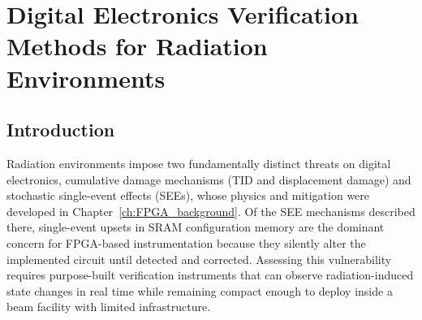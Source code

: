 %
%

\chapter{Digital Electronics Verification Methods for Radiation Environments}
\label{ch:digital_electronics}

\section{Introduction}
\label{sec:ch6_intro}

Radiation environments impose two fundamentally distinct threats on
digital electronics, cumulative damage mechanisms (TID and displacement
damage) and stochastic single-event effects (SEEs), whose physics and
mitigation were developed in Chapter~\ref{ch:FPGA_background}.  Of the
SEE mechanisms described there, single-event upsets in SRAM configuration
memory are the dominant concern for FPGA-based instrumentation because
they silently alter the implemented circuit until detected and corrected.
Assessing this vulnerability requires purpose-built verification
instruments that can observe radiation-induced state changes in real
time while remaining compact enough to deploy inside a beam facility
with limited infrastructure.

